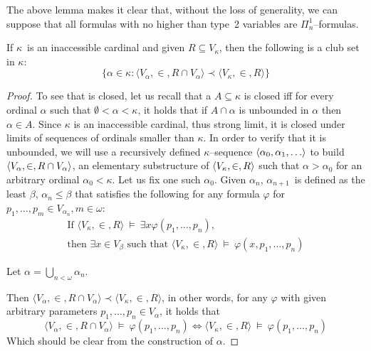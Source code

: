 The above lemma makes it clear that, without the loss of generality, we can suppose that all formulas with no higher than type~2 variables are $\Pi^1_n$–formulas.

\begin{lemma}\label{lemma:inaccessible_clubset}
If $\kappa$ is an inaccessible cardinal and given $R \subseteq V_\kappa$, then the following is a club set in $\kappa$:
\begin{equation}
\{\alpha \in \kappa : \langle V_\alpha, \in, R \cap V_\alpha \rangle \prec \langle V_\kappa, \in, R \rangle \}\label{eq:inacc_lemma_set}
\end{equation}
\end{lemma}

\begin{proof}
To see that  is closed, let us recall that a $A \subseteq \kappa$ is closed iff for every ordinal $\alpha$ such that $\emptyset < \alpha < \kappa$, it holds that if $A \cap \alpha$ is unbounded in $\alpha$ then $\alpha \in A$. Since $\kappa$ is an inaccessible cardinal, thus strong limit, it is closed under limits of sequences of ordinals smaller than $\kappa$.
In order to verify that it is unbounded, we will use a recursively defined $\kappa$–sequence $\langle \alpha_0, \alpha_1, \ldots \rangle$
to build $\langle V_\alpha, \in, R \cap V_\alpha \rangle$, an elementary substructure of $\langle V_\kappa, \in, R \rangle$ such that $\alpha > \alpha_0$ for an arbitrary ordinal $\alpha_0 < \kappa$.
Let us fix one such $\alpha_0$. Given $\alpha_n$, $\alpha_{n+1}$ is defined as the least $\beta$, $\alpha_n \leq \beta$ that satisfies 
the following for any formula $\varphi$ for $p_1, \ldots, p_m \in V_{\alpha_{n}}, m \in \omega$:
\begin{equation}
\begin{gathered}
\mbox{If }\langle V_\kappa, \in, R \rangle~\models~\exists x \varphi(p_1, \ldots, p_n)\mbox{,}\\
\mbox{then }\exists x \in V_\beta \mbox{ such that }\langle V_\kappa, \in, R \rangle~\models~\varphi(x, p_1, \ldots, p_n)
\end{gathered}
\end{equation}

Let $\alpha = \bigcup_{n < \omega} \alpha_n$. 

Then $\langle V_\alpha, \in, R \cap V_\alpha \rangle \prec \langle V_\kappa, \in, R \rangle$, in other words, for any $\varphi$ with given arbitrary parameters $p_1, \ldots, p_n \in V_\alpha$, it holds that
\begin{equation}
\langle V_\alpha, \in, R \cap V_\alpha \rangle~\models~\varphi(p_1, \ldots, p_n) \iff \langle V_\kappa, \in, R \rangle~\models~\varphi(p_1, \ldots, p_n)
\end{equation}
Which should be clear from the construction of $\alpha$.
\end{proof}

